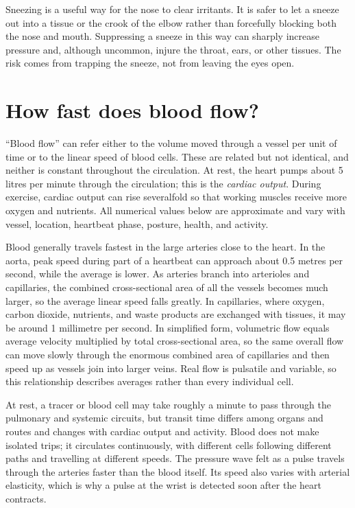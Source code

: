 \documentclass[11pt,oneside]{report}
\begin{document}
Sneezing is a useful way for the nose to clear irritants. It is safer to let a
sneeze out into a tissue or the crook of the elbow rather than forcefully
blocking both the nose and mouth. Suppressing a sneeze in this way can sharply
increase pressure and, although uncommon, injure the throat, ears, or other
tissues. The risk comes from trapping the sneeze, not from leaving the eyes
open.

\section{How fast does blood flow?}

``Blood flow'' can refer either to the volume moved through a vessel per unit of
time or to the linear speed of blood cells. These are related but not identical,
and neither is constant throughout the circulation. At rest, the heart pumps
about 5 litres per minute through the circulation; this is the \emph{cardiac
output}. During exercise, cardiac output can rise severalfold so that working
muscles receive more oxygen and nutrients. All numerical values below are
approximate and vary with vessel, location, heartbeat phase, posture, health,
and activity.

Blood generally travels fastest in the large arteries close to the heart. In the
aorta, peak speed during part of a heartbeat can approach about 0.5 metres per
second, while the average is lower. As arteries branch into arterioles and
capillaries, the combined cross-sectional area of all the vessels becomes much
larger, so the average linear speed falls greatly. In capillaries, where oxygen,
carbon dioxide, nutrients, and waste products are exchanged with tissues, it may
be around 1 millimetre per second. In simplified form, volumetric flow equals
average velocity multiplied by total cross-sectional area, so the same overall
flow can move slowly through the enormous combined area of capillaries and then
speed up as vessels join into larger veins. Real flow is pulsatile and variable,
so this relationship describes averages rather than every individual cell.

At rest, a tracer or blood cell may take roughly a minute to pass through the
pulmonary and systemic circuits, but transit time differs among organs and
routes and changes with cardiac output and activity. Blood does not make isolated
trips; it circulates continuously, with different cells following different
paths and travelling at different speeds. The pressure wave felt as a pulse
travels through the arteries faster than the blood itself. Its speed also varies
with arterial elasticity, which is why a pulse at the wrist is detected soon
after the heart contracts.
\end{document}
